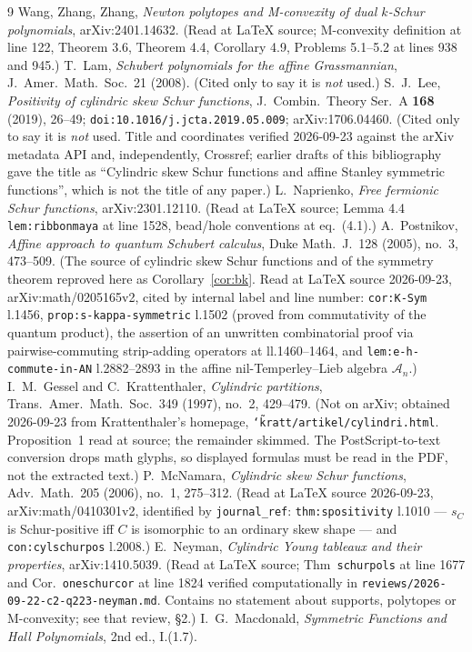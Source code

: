 \documentclass[11pt]{article}
\theoremstyle{plain}
\theoremstyle{definition}
\begin{document}
\begin{thebibliography}{9}
 Wang, Zhang, Zhang, \emph{Newton polytopes and M-convexity of dual $k$-Schur
polynomials}, arXiv:2401.14632. (Read at LaTeX source; M-convexity definition at line 122,
Theorem 3.6, Theorem 4.4, Corollary 4.9, Problems 5.1--5.2 at lines 938 and 945.)
 T.~Lam, \emph{Schubert polynomials for the affine Grassmannian}, J.\ Amer.\
Math.\ Soc.\ 21 (2008). (Cited only to say it is \emph{not} used.)
\bibitem{Lee2019} S.~J.~Lee, \emph{Positivity of cylindric skew Schur functions}, J.\ Combin.\
Theory Ser.~A \textbf{168} (2019), 26--49; \texttt{doi:10.1016/j.jcta.2019.05.009};
arXiv:1706.04460. (Cited only to say it is \emph{not} used. Title and coordinates verified
2026-09-23 against the arXiv metadata API and, independently, Crossref; earlier drafts of this
bibliography gave the title as ``Cylindric skew Schur functions and affine Stanley symmetric
functions'', which is not the title of any paper.)
\bibitem{Nap} L.~Naprienko, \emph{Free fermionic Schur functions}, arXiv:2301.12110. (Read at
LaTeX source; Lemma 4.4 \texttt{lem:ribbonmaya} at line 1528, bead/hole conventions at
eq.~(4.1).)
\bibitem{Post} A.~Postnikov, \emph{Affine approach to quantum Schubert calculus}, Duke Math.\
J.\ 128 (2005), no.~3, 473--509. (The source of cylindric skew Schur functions and of the
symmetry theorem reproved here as Corollary~\ref{cor:bk}. Read at LaTeX source 2026-09-23,
arXiv:math/0205165v2, cited by internal label and line number: \texttt{cor:K-Sym} l.1456,
\texttt{prop:s-kappa-symmetric} l.1502 (proved from commutativity of the quantum product),
the assertion of an unwritten combinatorial proof via pairwise-commuting strip-adding operators
at ll.1460--1464, and \texttt{lem:e-h-commute-in-AN} l.2882--2893 in the affine
nil-Temperley--Lieb algebra $\mathcal{A}_n$.)
\bibitem{GesKra} I.~M.~Gessel and C.~Krattenthaler, \emph{Cylindric partitions}, Trans.\ Amer.\
Math.\ Soc.\ 349 (1997), no.~2, 429--479. (Not on arXiv; obtained 2026-09-23 from
Krattenthaler's homepage, \texttt{\char`\~kratt/artikel/cylindri.html}. Proposition~1 read at
source; the remainder skimmed. The PostScript-to-text conversion drops math glyphs, so displayed
formulas must be read in the PDF, not the extracted text.)
\bibitem{McN} P.~McNamara, \emph{Cylindric skew Schur functions}, Adv.\ Math.\ 205 (2006),
no.~1, 275--312. (Read at LaTeX source 2026-09-23, arXiv:math/0410301v2, identified by
\texttt{journal\_ref}: \texttt{thm:spositivity} l.1010 --- $s_C$ is Schur-positive iff $C$ is
isomorphic to an ordinary skew shape --- and \texttt{con:cylschurpos} l.2008.)
\bibitem{Ney} E.~Neyman, \emph{Cylindric Young tableaux and their properties},
arXiv:1410.5039. (Read at LaTeX source; Thm~\texttt{schurpols} at line 1677 and
Cor.~\texttt{oneschurcor} at line 1824 verified computationally in
\texttt{reviews/2026-09-22-c2-q223-neyman.md}. Contains no statement about supports,
polytopes or M-convexity; see that review, \S2.)
\bibitem{Mac} I.~G.~Macdonald, \emph{Symmetric Functions and Hall Polynomials}, 2nd ed., I.(1.7).
\end{thebibliography}
\end{document}
